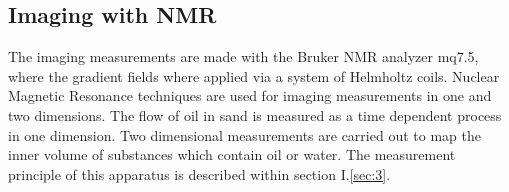\subsection{Imaging with NMR}
The imaging measurements are made with the Bruker NMR analyzer mq7.5, where the gradient fields where applied via a system of Helmholtz coils. Nuclear Magnetic Resonance techniques are used for imaging measurements in one and two dimensions. The flow of oil in sand is measured as a time dependent process in one dimension. Two dimensional measurements are carried out to map the inner volume of substances which contain oil or water. The measurement principle of this apparatus is described within section I.\ref{sec:3}.\cite{manual}
